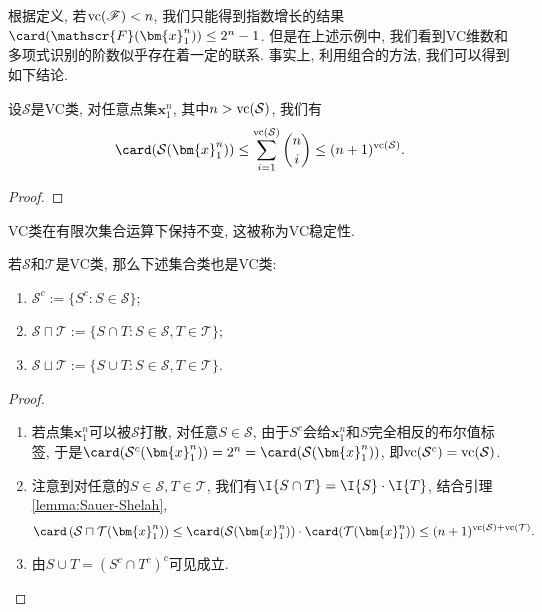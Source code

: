 根据定义, 若$\mathrm{vc}(\mathscr{F}) < n$, 我们只能得到指数增长的结果$\card(\mathscr{F}(\bm{x}_1^n)) \leq 2^n - 1$.
但是在上述示例中, 我们看到VC维数和多项式识别的阶数似乎存在着一定的联系.
事实上, 利用组合的方法, 我们可以得到如下结论. 
\begin{lemma}\label{lemma:Sauer-Shelah}
	设$\mathcal{S}$是VC类, 对任意点集$\bm{x}_1^n$, 其中$n > \mathrm{vc}(\mathcal{S})$, 我们有
	\begin{equation*}
		\card(\mathcal{S}(\bm{x}_1^n))
		\leq \sum_{i=1}^{\vc(\mathcal{S})} \binom ni
		\leq (n+1)^{\vc(\mathcal{S})}. 
	\end{equation*}
\end{lemma}
\begin{proof}
	
\end{proof}

VC类在有限次集合运算下保持不变, 这被称为VC稳定性. 
\begin{proposition}[VC稳定性]
	若$\mathcal{S}$和$\mathcal{T}$是VC类, 那么下述集合类也是VC类: 
	\begin{enumerate}[label=(\arabic*)]
		\item $\mathcal{S}^c := \{S^c \colon S \in \mathcal{S}\}$;
		\item $\mathcal{S} \sqcap \mathcal{T} := \{S \cap T \colon S \in \mathcal{S}, T \in \mathcal{T}\}$;
		\item $\mathcal{S} \sqcup \mathcal{T} := \{S \cup T \colon S \in \mathcal{S}, T \in \mathcal{T}\}$.
	\end{enumerate}
\end{proposition}
\begin{proof}
	\begin{enumerate}[label=(\arabic*)]
		\item 若点集$\bm{x}_1^n$可以被$\mathcal{S}$打散, 对任意$S \in \mathcal{S}$, 由于$S^c$会给$\bm{x}_1^n$和$S$完全相反的布尔值标签, 于是$\card(\mathcal{S}^c(\bm{x}_1^n)) = 2^n = \card(\mathcal{S}(\bm{x}_1^n))$, 即$\mathrm{vc}(\mathcal{S}^c) = \mathrm{vc}(\mathcal{S})$. 
		\item 注意到对任意的$S \in \mathcal{S}, T \in \mathcal{T}$, 我们有$\I{S \cap T} = \I{S} \cdot \I{T}$, 结合引理\ref{lemma:Sauer-Shelah}, 
			\begin{equation*}
				\card\left( \mathcal{S} \sqcap \mathcal{T} (\bm{x}_1^n) \right) 
				\leq \card(\mathcal{S}(\bm{x}_1^n)) \cdot \card(\mathcal{T}(\bm{x}_1^n))
				\leq (n+1)^{\vc(\mathcal{S}) + \vc(\mathcal{T})}. 
			\end{equation*}
		\item 由$S \cup T = (S^c \cap T^c)^c$可见成立. 
	\end{enumerate}
\end{proof}


